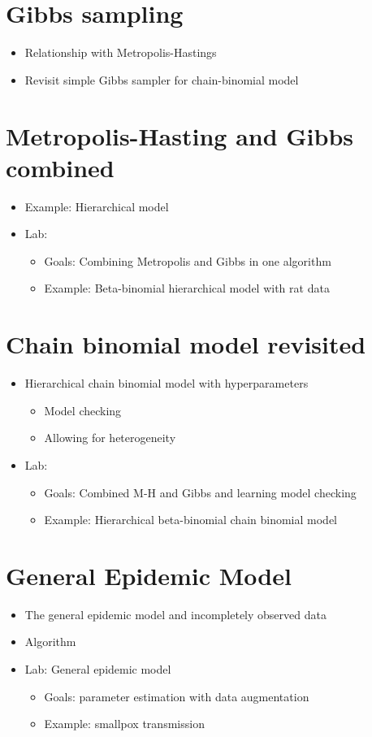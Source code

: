 \documentclass[11pt]{article}
\begin{document}
\section{Gibbs sampling}
\begin{itemize}
\item Relationship with  Metropolis-Hastings
\item Revisit simple Gibbs sampler for chain-binomial model 
\end{itemize}

\section{Metropolis-Hasting and Gibbs combined} 
\begin{itemize}
\item Example: Hierarchical model
\item Lab:
\begin{itemize}
\item Goals: Combining Metropolis and Gibbs in one algorithm
\item Example: Beta-binomial hierarchical model with rat data
\end{itemize}
\end{itemize}

\section{Chain binomial model revisited} 
\begin{itemize} 
\item Hierarchical chain binomial model with hyperparameters
\begin{itemize}
\item  Model checking 
\item Allowing for heterogeneity
\end{itemize}
\item Lab: 
\begin{itemize}
\item Goals: Combined M-H and Gibbs and learning model checking
\item   Example: Hierarchical beta-binomial chain binomial model
\end{itemize}
\end{itemize}


\section{General Epidemic Model}
\begin{itemize}
\item The general epidemic model and incompletely observed data 
\item Algorithm
\item {Lab: General epidemic model}
\begin{itemize}
\item  Goals: parameter estimation with data augmentation
\item Example: smallpox transmission
\end{itemize}
\end{itemize}
\end{document}
